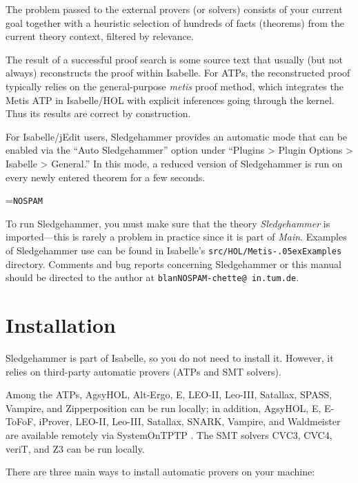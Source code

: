 \documentclass[a4paper,12pt]{article}
\renewcommand\_{\hbox{\textunderscore\kern-.05ex}}
\begin{document}
The problem passed to the external provers (or solvers) consists of your current
goal together with a heuristic selection of hundreds of facts (theorems) from the
current theory context, filtered by relevance.

The result of a successful proof search is some source text that usually (but
not always) reconstructs the proof within Isabelle. For ATPs, the reconstructed
proof typically relies on the general-purpose \textit{metis} proof method, which
integrates the Metis ATP in Isabelle/HOL with explicit inferences going through
the kernel. Thus its results are correct by construction.

For Isabelle/jEdit users, Sledgehammer provides an automatic mode that can be
enabled via the ``Auto Sledgehammer'' option under ``Plugins > Plugin Options >
Isabelle > General.'' In this mode, a reduced version of Sledgehammer is run on
every newly entered theorem for a few seconds.

\newbox\boxA
\setbox\boxA=\hbox{\texttt{NOSPAM}}

\newcommand\authoremail{\texttt{blan{\color{white}NOSPAM}\kern-\wd\boxA{}chette@\allowbreak
in.\allowbreak tum.\allowbreak de}}

To run Sledgehammer, you must make sure that the theory \textit{Sledgehammer} is
imported---this is rarely a problem in practice since it is part of
\textit{Main}. Examples of Sledgehammer use can be found in Isabelle's
\texttt{src/HOL/Metis\_Examples} directory.
Comments and bug reports concerning Sledgehammer or this manual should be
directed to the author at \authoremail.


\section{Installation}
\label{installation}

Sledgehammer is part of Isabelle, so you do not need to install it. However, it
relies on third-party automatic provers (ATPs and SMT solvers).

Among the ATPs, AgsyHOL, Alt-Ergo, E, LEO-II, Leo-III, Satallax, SPASS, Vampire, and
Zipperposition can be run locally; in addition, AgsyHOL, E, E-ToFoF, iProver,
LEO-II, Leo-III, Satallax, SNARK, Vampire, and Waldmeister are available
remotely via System\-On\-TPTP \cite{sutcliffe-2000}. The SMT solvers CVC3,
CVC4, veriT, and Z3 can be run locally.

There are three main ways to install automatic provers on your machine:
\end{document}
